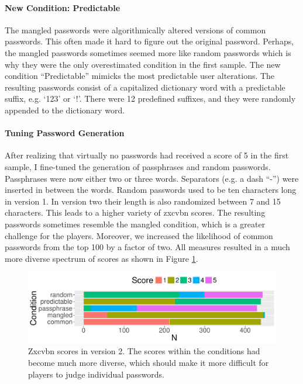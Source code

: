 \paragraph{New Condition: Predictable} The mangled passwords were algorithmically altered versions of common passwords. This often made it hard to figure out the original password. Perhaps, the mangled passwords sometimes seemed more like random passwords which is why they were the only overestimated condition in the first sample. The new condition ``Predictable'' mimicks the most predictable user alterations. The resulting passwords consist of a capitalized dictionary word with a predictable suffix, e.g. `123' or `!'. There were 12 predefined suffixes, and they were randomly appended to the dictionary word. 

\paragraph{Tuning Password Generation} After realizing that virtually no passwords had received a score of 5 in the first sample, I fine-tuned the generation of passphrases and random passwords. Passphrases were now either two or three words. Separators (e.g. a dash ``-'') were inserted in between the words. Random passwords used to be ten characters long in version 1. In version two their length is also randomized between 7 and 15 characters. This leads to a higher variety of zxcvbn scores. The resulting passwords sometimes resemble the mangled condition, which is a greater challenge for the players. Moreover, we increased the likelihood of common passwords from the top 100 by a factor of two. All measures resulted in a much more diverse spectrum of scores as shown in Figure \ref{fig:pasdjo:score-distribution-v2}.

\begin{figure}[htbp]
	\centering
	\includegraphics[width=0.7\linewidth]{figures/pasdjo/score-distribution-v2}
	\caption{\label{fig:pasdjo:score-distribution-v2}Zxcvbn scores in version 2. The scores within the conditions had become much more diverse, which should make it more difficult for players to judge individual passwords.}
\end{figure}

